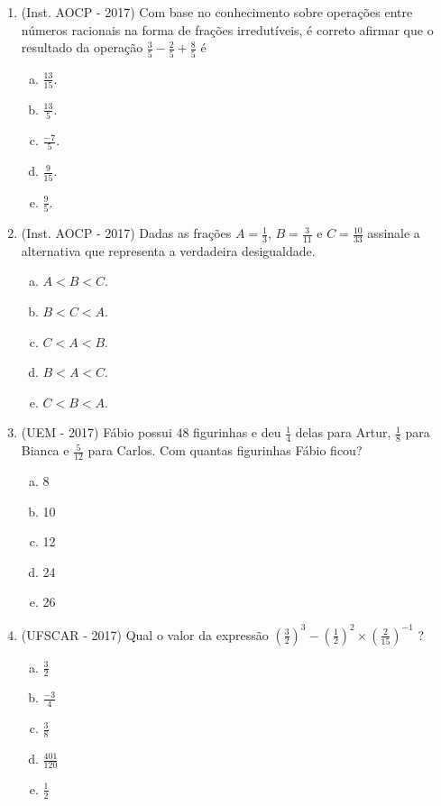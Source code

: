 \begin{enumerate}
  \item (Inst. AOCP - 2017) Com base no conhecimento sobre operações entre números racionais na forma de frações irredutíveis, é correto afirmar que o resultado da operação $\frac{3}{5} - \frac{2}{5} + \frac{8}{5}$  é
  \begin{enumerate}[a)]
  \item $\frac{13}{15}$.
  \item $\frac{13}{5}$.
  \item $\frac{-7}{5}$.
  \item $\frac{9}{15}$.
  \item $\frac{9}{5}$.
  \end{enumerate}

  \item (Inst. AOCP - 2017) Dadas as frações $A= \frac{1}{3}$, $B= \frac{3}{11}$ e $C= \frac{10}{33}$ assinale a alternativa que representa a verdadeira desigualdade.
  \begin{enumerate}[a)]
  \item $A < B < C$.
  \item $B < C < A$.
  \item $C < A < B$.
  \item $B < A < C$.
  \item $C < B < A$.
  \end{enumerate}

  \item (UEM - 2017) Fábio possui $48$ figurinhas e deu $\frac{1}{4}$ delas para Artur, $\frac{1}{8}$ para Bianca e $\frac{5}{12}$ para Carlos. Com quantas figurinhas Fábio ficou?
  \begin{enumerate}[a)]
  \item 8
  \item 10
  \item 12
  \item 24
  \item 26
  \end{enumerate}

  \item (UFSCAR - 2017) Qual o valor da expressão $(\frac{3}{2})^3 - (\frac{1}{2})^2 \times (\frac{2}{15})^{-1}$ ?
  \begin{enumerate}[a)]
  \item $\frac{3}{2}$
  \item $\frac{-3}{4}$
  \item $\frac{3}{8}$
  \item $\frac{401}{120}$
  \item $\frac{1}{2}$
  \end{enumerate}


\end{enumerate}
